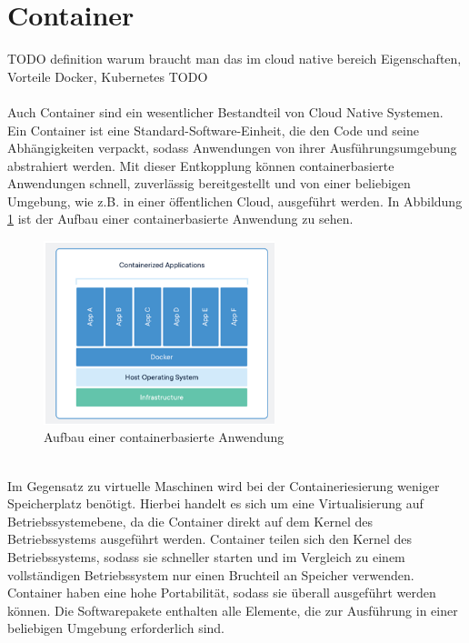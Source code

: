 \section{Container}
TODO definition
warum braucht man das im cloud native bereich
Eigenschaften, Vorteile
Docker, Kubernetes TODO\\
\\
Auch Container sind ein wesentlicher Bestandteil von Cloud Native Systemen. \\
Ein Container ist eine Standard-Software-Einheit, die den Code und seine Abhängigkeiten verpackt, sodass Anwendungen von ihrer Ausführungsumgebung abstrahiert werden. Mit dieser Entkopplung können containerbasierte Anwendungen schnell, zuverlässig bereitgestellt und von einer beliebigen Umgebung, wie z.B. in einer öffentlichen Cloud, ausgeführt werden. In Abbildung \ref{container} ist der Aufbau einer containerbasierte Anwendung zu sehen.\\
\begin{figure}[bth] 
	\centering
	\includegraphics[width=0.6\textwidth]{Graphics/Container.png}
	\caption{Aufbau einer containerbasierte Anwendung}
	\label{container}
\end{figure}\\
Im Gegensatz zu virtuelle Maschinen wird bei der Containeriesierung weniger Speicherplatz benötigt. Hierbei handelt es sich um eine Virtualisierung auf Betriebssystemebene, da die Container direkt auf dem Kernel des Betriebssystems ausgeführt werden. Container teilen sich den Kernel des Betriebssystems, sodass sie schneller starten und im Vergleich zu einem vollständigen Betriebssystem nur einen Bruchteil an Speicher verwenden.\\
Container haben eine hohe Portabilität, sodass sie überall ausgeführt werden können. Die Softwarepakete enthalten alle Elemente, die zur Ausführung in einer beliebigen Umgebung erforderlich sind.\\
